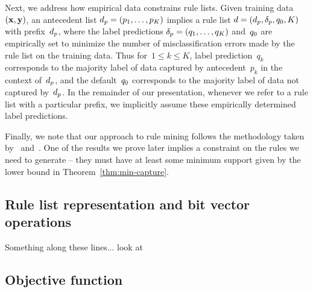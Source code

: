 Next, we address how empirical data constrains rule lists.
%
Given training data~${(\mathbf{x}, \mathbf{y})}$,
an antecedent list ${d_p = (p_1, \dots, p_K)}$
implies a rule list ${{d} = (d_p, \delta_p, q_0, K)}$
with prefix~$d_p$, where the label predictions
${\delta_p = (q_1, \dots, q_K)}$ and~$q_0$ are empirically set
to minimize the number of misclassification errors made by
the rule list on the training data.
%
Thus for~${1 \le k \le K}$, label prediction~$q_k$ corresponds to the
majority label of data captured by antecedent~$p_k$ in the context of~$d_p$,
and the default~$q_0$ corresponds to the majority label of data
not captured by~$d_p$.
%
In the remainder of our presentation, whenever we refer to a rule list with a
particular prefix, we implicitly assume these empirically determined label predictions.

Finally, we note that our approach to rule mining
follows the methodology taken by~\citet{LethamRuMcMa15} and~\citet{YangRuSe16}.
%
One of the results we prove later implies a constraint on the rules
we need to generate -- they must have at least some minimum support
given by the lower bound in Theorem~\ref{thm:min-capture}.

\begin{arxiv}
\subsection{Rule list representation and bit vector operations}
Something along these lines... look at~\citet{YangRuSe16}
\end{arxiv}

\subsection{Objective function}


